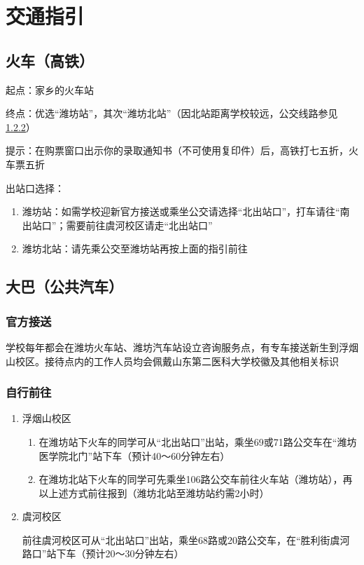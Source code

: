
\section[交通指引]{交通指引}
\label{goto_school}
\subsection[火车（高铁）]{火车（高铁）}
起点：家乡的火车站

终点：优选“潍坊站”，其次“潍坊北站”（因北站距离学校较远，公交线路参见\uline{\ref{bus}}）

提示：在购票窗口出示你的录取通知书（不可使用复印件）后，高铁打七五折，火车票五折

出站口选择：
\begin{enumerate}
    \item 潍坊站：如需学校迎新官方接送或乘坐公交请选择“北出站口”，打车请往“南出站口”；需要前往虞河校区请走“北出站口”
    \item 潍坊北站：请先乘公交至潍坊站再按上面的指引前往
\end{enumerate}

\subsection[大巴（公共汽车）]{大巴（公共汽车）}

\subsubsection[官方接送]{官方接送}
学校每年都会在潍坊火车站、潍坊汽车站设立咨询服务点，有专车接送新生到浮烟山校区。接待点内的工作人员均会佩戴山东第二医科大学校徽及其他相关标识

\subsubsection[自行前往]{自行前往}
\label{bus}
\begin{enumerate}
    \item 浮烟山校区
          \begin{enumerate}
              \item 在潍坊站下火车的同学可从“北出站口”出站，乘坐69或71路公交车在“潍坊医学院北门”站下车（预计40～60分钟左右）
              \item 在潍坊北站下火车的同学可先乘坐106路公交车前往火车站（潍坊站），再以上述方式前往报到（潍坊北站至潍坊站约需2小时）
          \end{enumerate}
    \item 虞河校区

          前往虞河校区可从“北出站口”出站，乘坐68路或20路公交车，在“胜利街虞河路口”站下车（预计20～30分钟左右）
\end{enumerate}


